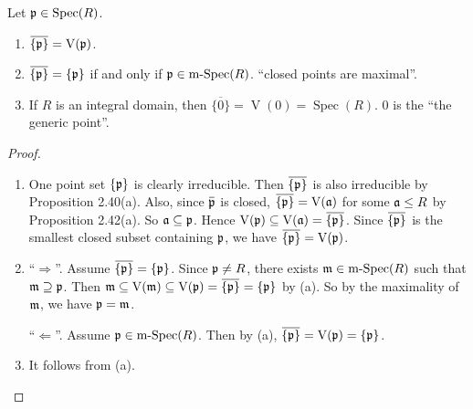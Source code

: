 \begin{proposition}
    Let $\mathfrak{p} \in \operatorname{Spec}(R)$.
    \begin{enumerate}
        \item $\overbar {\{\ffp\}} = \operatorname{V}(\ffp)$.
        \item $\overbar {\{\ffp\}} = \{\ffp\}$ if and only if $\mathfrak{p} \in \operatorname{m-Spec}(R)$. ``closed points are maximal''.
        \item If $R$ is an integral domain, then $\overbar {\{0\}} = \operatorname{V}(0) = \operatorname{Spec}(R)$. 0 is the ``the generic point''.
    \end{enumerate}
\end{proposition}

\begin{proof}
    \begin{enumerate}
        \item 
            One point set $\{\mathfrak{p}\}$ is clearly irreducible. Then $\overbar {\{\ffp\}}$ is also irreducible by Proposition 2.40(a). Also, since $\overbar {\ffp}$ is closed, $\overbar {\{\ffp\}} = \operatorname{V}(\ffa)$ for some $\mathfrak{a} \leq R$ by Proposition 2.42(a). So $\mathfrak{a} \subseteq \mathfrak{p}$. Hence $\operatorname{V}(\ffp) \subseteq \operatorname{V}(\ffa) = \overbar {\{\ffp\}}$. Since $\overbar {\{\ffp\}}$ is the smallest closed subset containing $\mathfrak{p}$, we have $\overbar {\{\ffp\}} = \operatorname{V}(\ffp)$.
        \item 
            ``$\Rightarrow$''. Assume $\overbar{\{\ffp\}} = \{\ffp\}$. Since $\mathfrak{p} \neq R$, there exists $\mathfrak{m} \in \operatorname{m-Spec}(R)$ such that $\mathfrak{m} \supseteq \mathfrak{p}$. Then $\ffm \subseteq \operatorname{V}(\ffm) \subseteq \operatorname{V}(\ffp) = \overbar {\{\ffp\}} = \{\ffp\}$ by (a). So by the maximality of $\mathfrak{m}$, we have $\mathfrak{p} = \mathfrak{m}$. \par 
            ``$\Leftarrow$''. Assume $\mathfrak{p} \in \operatorname{m-Spec}(R)$. Then by (a), $\overbar {\{\ffp\}} = \operatorname{V}(\ffp) = \{\ffp\}$. 
        \item It follows from (a). \qedhere
    \end{enumerate}
\end{proof}
